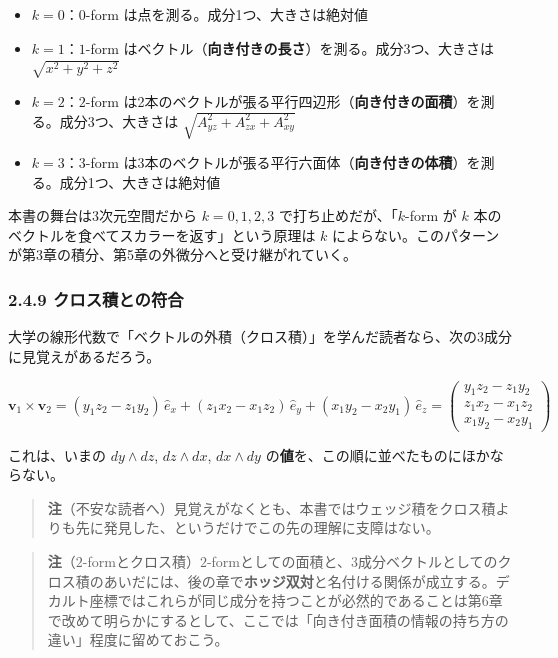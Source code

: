 \documentclass[a4paper,12pt,openany]{book}
\begin{document}
\begin{itemize}
\item
  \(k=0\)：\(0\)-form は点を測る。成分1つ、大きさは絶対値
\item
  \(k=1\)：\(1\)-form
  はベクトル（\textbf{向き付きの長さ}）を測る。成分3つ、大きさは
  \(\sqrt{x^2+y^2+z^2}\)
\item
  \(k=2\)：\(2\)-form
  は2本のベクトルが張る平行四辺形（\textbf{向き付きの面積}）を測る。成分3つ、大きさは
  \(\sqrt{A_{yz}^2+A_{zx}^2+A_{xy}^2}\)
\item
  \(k=3\)：\(3\)-form
  は3本のベクトルが張る平行六面体（\textbf{向き付きの体積}）を測る。成分1つ、大きさは絶対値
\end{itemize}

本書の舞台は3次元空間だから \(k=0,1,2,3\) で打ち止めだが、「\(k\)-form
が \(k\) 本のベクトルを食べてスカラーを返す」という原理は \(k\)
によらない。このパターンが第3章の積分、第5章の外微分へと受け継がれていく。

\hypertarget{ux30afux30edux30b9ux7a4dux3068ux306eux7b26ux5408}{%
\subsubsection{2.4.9
クロス積との符合}\label{ux30afux30edux30b9ux7a4dux3068ux306eux7b26ux5408}}

大学の線形代数で「ベクトルの外積（クロス積）」を学んだ読者なら、次の3成分に見覚えがあるだろう。

\[\mathbf{v}_1 \times \mathbf{v}_2 = (y_1 z_2 - z_1 y_2)\,\hat{e}_x + (z_1 x_2 - x_1 z_2)\,\hat{e}_y + (x_1 y_2 - x_2 y_1)\,\hat{e}_z = \begin{pmatrix} y_1 z_2 - z_1 y_2 \\ z_1 x_2 - x_1 z_2 \\ x_1 y_2 - x_2 y_1 \end{pmatrix}\]

これは、いまの \(dy \wedge dz\), \(dz \wedge dx\), \(dx \wedge dy\)
の\textbf{値}を、この順に並べたものにほかならない。

\begin{quote}
\textbf{注}（不安な読者へ）見覚えがなくとも、本書ではウェッジ積をクロス積よりも先に発見した、というだけでこの先の理解に支障はない。
\end{quote}

\begin{quote}
\textbf{注}（\(2\)-formとクロス積）\(2\)-formとしての面積と、3成分ベクトルとしてのクロス積のあいだには、後の章で\textbf{ホッジ双対}と名付ける関係が成立する。デカルト座標ではこれらが同じ成分を持つことが必然的であることは第6章で改めて明らかにするとして、ここでは「向き付き面積の情報の持ち方の違い」程度に留めておこう。
\end{quote}
\end{document}
